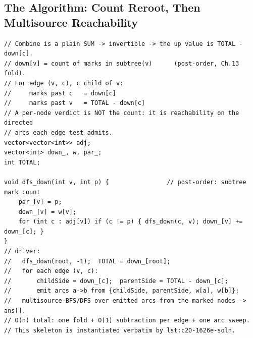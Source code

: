 \subsection{The Algorithm: Count Reroot, Then Multisource Reachability}

\begin{lstlisting}[caption={Reroot a count of marked nodes: the parent side of every edge is TOTAL - down[c] (one subtraction), the counts drive a per-edge decision, and a multisource sweep assembles per-node verdicts.}, label={lst:c20-count}]
// Combine is a plain SUM -> invertible -> the up value is TOTAL - down[c].
// down[v] = count of marks in subtree(v)      (post-order, Ch.13 fold).
// For edge (v, c), c child of v:
//     marks past c   = down[c]
//     marks past v   = TOTAL - down[c]
// A per-node verdict is NOT the count: it is reachability on the directed
// arcs each edge test admits.
vector<vector<int>> adj;
vector<int> down_, w, par_;
int TOTAL;

void dfs_down(int v, int p) {                // post-order: subtree mark count
    par_[v] = p;
    down_[v] = w[v];
    for (int c : adj[v]) if (c != p) { dfs_down(c, v); down_[v] += down_[c]; }
}
// driver:
//   dfs_down(root, -1);  TOTAL = down_[root];
//   for each edge (v, c):
//       childSide = down_[c];  parentSide = TOTAL - down_[c];
//       emit arcs a->b from {childSide, parentSide, w[a], w[b]};
//   multisource-BFS/DFS over emitted arcs from the marked nodes -> ans[].
// O(n) total: one fold + O(1) subtraction per edge + one arc sweep.
// This skeleton is instantiated verbatim by lst:c20-1626e-soln.
\end{lstlisting}

